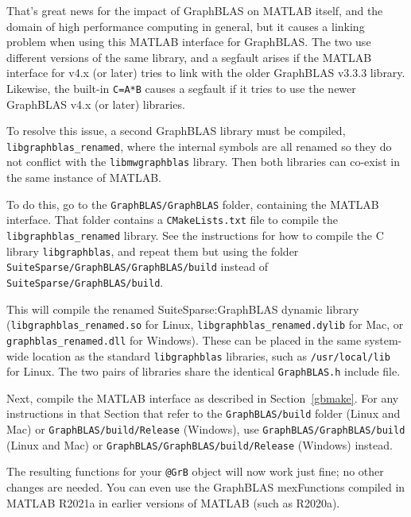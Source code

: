 \documentclass[12pt]{article}
\begin{document}
{That's great news for the impact of GraphBLAS on MATLAB itself, and the domain
of high performance computing in general, but it causes a linking problem when
using this MATLAB interface for GraphBLAS.  The two use different versions of
the same library, and a segfault arises if the MATLAB interface for v4.x (or
later) tries to link with the older GraphBLAS v3.3.3 library.  Likewise, the
built-in \verb'C=A*B' causes a segfault if it tries to use the newer GraphBLAS
v4.x (or later) libraries.

To resolve this issue, a second GraphBLAS library must be compiled,
\verb'libgraphblas_renamed', where the internal symbols are all renamed so they
do not conflict with the \verb'libmwgraphblas' library.  Then both libraries
can co-exist in the same instance of MATLAB.

To do this, go to the \verb'GraphBLAS/GraphBLAS' folder, containing the
MATLAB interface.  That folder contains a \verb'CMakeLists.txt' file to
compile the \verb'libgraphblas_renamed' library.  See the instructions
for how to compile the C library \verb'libgraphblas', and repeat them but
using the folder \newline
\verb'SuiteSparse/GraphBLAS/GraphBLAS/build' instead of \newline
\verb'SuiteSparse/GraphBLAS/build'.

This will compile the renamed SuiteSparse:GraphBLAS dynamic library
(\verb'libgraphblas_renamed.so' for Linux, \verb'libgraphblas_renamed.dylib'
for Mac, or \verb'graphblas_renamed.dll' for Windows).  These can be
placed in the same system-wide location as the standard \verb'libgraphblas'
libraries, such as \verb'/usr/local/lib' for Linux.  The two pairs of
libraries share the identical \verb'GraphBLAS.h' include file.

Next, compile the MATLAB interface as described in Section~\ref{gbmake}.  For
any instructions in that Section that refer to the \verb'GraphBLAS/build'
folder (Linux and Mac) or \verb'GraphBLAS/build/Release' (Windows), use \newline
\verb'GraphBLAS/GraphBLAS/build' (Linux and Mac) or \newline
\verb'GraphBLAS/GraphBLAS/build/Release' (Windows) instead.

The resulting functions for your \verb'@GrB' object will now work just fine;
no other changes are needed.  You can even use the GraphBLAS mexFunctions
compiled in MATLAB R2021a in earlier versions of MATLAB (such as R2020a).

}
\end{document}
